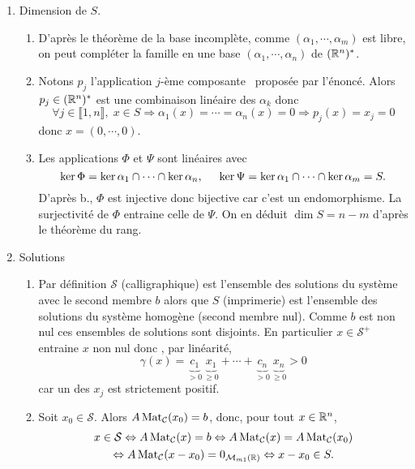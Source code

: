 \begin{enumerate}
  \item Dimension de $S$.
  \begin{enumerate}
    \item D'après le théorème de la base incomplète, comme $(\alpha_1, \cdots, \alpha_m)$ est libre, on peut compléter la famille en une base $(\alpha_1, \cdots, \alpha_n)$ de $(\mathbb{R}^n)^*$.
    \item Notons $p_j$ l'application \og$j$-ème composante\fg~ proposée par l'énoncé.\newline
    Alors $p_j\in (\mathbb{R}^n)^*$ est une combinaison linéaire des $\alpha_k$ donc
\[
\forall j \in \llbracket 1,n\rrbracket, \;  x \in S \Rightarrow \alpha_1(x) = \cdots = \alpha_n(x) = 0 \Rightarrow p_j(x) = x_j = 0
\]
donc $x = (0, \cdots, 0)$.
    \item Les applications $\Phi$ et $\Psi$ sont linéaires avec
\[
  \ker \Phi = \ker \alpha_1 \cap \cdots \cap \ker \alpha_n, \hspace{0.5cm} \ker \Psi = \ker \alpha_1 \cap \cdots \cap \ker \alpha_m = S.
\]
D'après b., $\Phi$ est injective donc bijective car c'est un endomorphisme. La surjectivité de $\Phi$ entraine celle de $\Psi$. On en déduit $\dim S = n - m$ d'après le théorème du rang. 
  \end{enumerate}

  \item Solutions
  \begin{enumerate}
    \item Par définition $\mathcal{S}$ (calligraphique) est l'ensemble des solutions du système avec le second membre $b$ alors que $S$ (imprimerie) est l'ensemble des solutions du système homogène (second membre nul). Comme $b$ est non nul ces ensembles de solutions sont disjoints. En particulier $x \in \mathcal{S}^+$ entraine $x$ non nul donc , par linéarité,
\[
  \gamma(x) = \underset{>0}{\underbrace{c_1}}\,\underset{\geq 0}{\underbrace{x_1}} + \cdots 
             + \underset{>0}{\underbrace{c_n}}\,\underset{\geq 0}{\underbrace{x_n}} > 0
\]
car un des $x_j$ est strictement positif.
    \item Soit $x_0 \in \mathcal{S}$. Alors $A \operatorname{Mat}_{\mathcal{C}}(x_0) = b$, donc, pour tout $x \in \mathbb{R}^n$,
\begin{multline*}
  x \in \mathcal{S} \Leftrightarrow A \operatorname{Mat}_{\mathcal{C}}(x) = b
  \Leftrightarrow A \operatorname{Mat}_{\mathcal{C}}(x) = A \operatorname{Mat}_{\mathcal{C}}(x_0) \\
  \Leftrightarrow A \operatorname{Mat}_{\mathcal{C}}(x -x_0) = 0_{\mathcal{M}_{m 1}(\mathbb{R})}
  \Leftrightarrow x - x_0 \in S.
\end{multline*}


\end{enumerate}
\end{enumerate}
